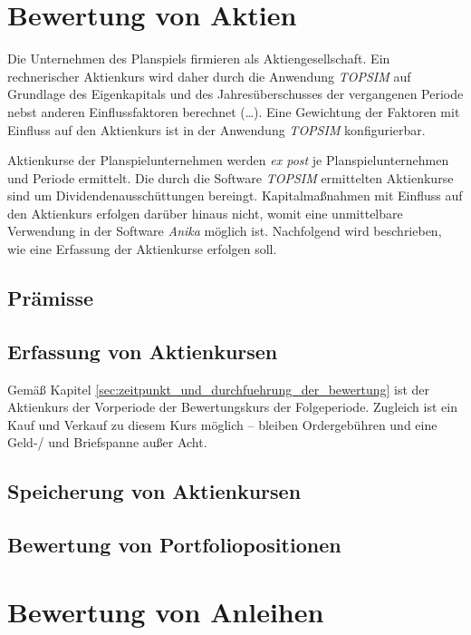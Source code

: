 \documentclass[12pt, a4paper]{article}
\begin{document}
\section{Bewertung von Aktien}
\label{sec:bewertung_von_aktien}
Die Unternehmen des Planspiels firmieren als Aktiengesellschaft.
Ein rechnerischer Aktienkurs wird daher durch die Anwendung \textit{TOPSIM} auf Grundlage des Eigenkapitals und des Jahresüberschusses der vergangenen Periode nebst anderen Einflussfaktoren berechnet (\dots). 
Eine Gewichtung der Faktoren mit Einfluss auf den Aktienkurs ist in der Anwendung \textit{TOPSIM} konfigurierbar. 

Aktienkurse der Planspielunternehmen werden \textit{ex post} je Planspielunternehmen und Periode ermittelt. Die durch die Software \textit{TOPSIM} ermittelten Aktienkurse sind um Dividendenausschüttungen bereingt. Kapitalmaßnahmen mit Einfluss auf den Aktienkurs erfolgen darüber hinaus nicht, womit eine unmittelbare Verwendung in der Software \textit{Anika} möglich ist. Nachfolgend wird beschrieben, wie eine Erfassung der Aktienkurse erfolgen soll.

\subsection{Prämisse}

\subsection{Erfassung von Aktienkursen}


Gemäß Kapitel \ref{sec:zeitpunkt_und_durchfuehrung_der_bewertung} ist der Aktienkurs der Vorperiode der Bewertungskurs der Folgeperiode.
Zugleich ist ein Kauf und Verkauf zu diesem Kurs möglich -- bleiben Ordergebühren und eine Geld-/ und Briefspanne außer Acht. 

\subsection{Speicherung von Aktienkursen}

\subsection{Bewertung von Portfoliopositionen}





\section{Bewertung von Anleihen}
\end{document}
